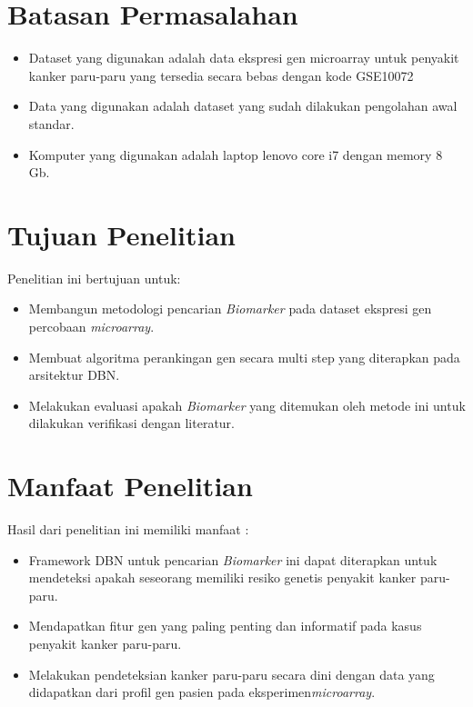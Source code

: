 \section{Batasan Permasalahan}

\begin{itemize}
\item Dataset yang digunakan adalah data ekspresi gen microarray untuk penyakit kanker paru-paru yang tersedia secara bebas dengan kode GSE10072
\item Data yang digunakan adalah dataset yang sudah dilakukan pengolahan awal standar.
\item Komputer yang digunakan adalah laptop lenovo core i7 dengan memory 8 Gb.
\end{itemize}

\section{Tujuan Penelitian}
Penelitian ini bertujuan untuk:
\begin{itemize}
\item Membangun metodologi pencarian \textit{Biomarker} pada dataset ekspresi gen percobaan \textit{microarray}.
\item Membuat algoritma perankingan gen secara multi step yang diterapkan pada arsitektur DBN.
\item Melakukan evaluasi apakah \textit{Biomarker} yang ditemukan oleh metode ini untuk dilakukan verifikasi dengan literatur.
\end{itemize}


\section{Manfaat Penelitian}
Hasil dari penelitian ini memiliki manfaat :
\begin{itemize}
\item Framework DBN untuk pencarian \textit{Biomarker} ini dapat diterapkan untuk mendeteksi apakah seseorang memiliki resiko genetis penyakit kanker paru-paru. 
\item Mendapatkan fitur gen yang paling penting dan informatif pada kasus penyakit kanker paru-paru.
\item Melakukan pendeteksian kanker paru-paru secara dini dengan data yang didapatkan dari profil gen pasien pada eksperimen\textit{microarray}.
\end{itemize}


